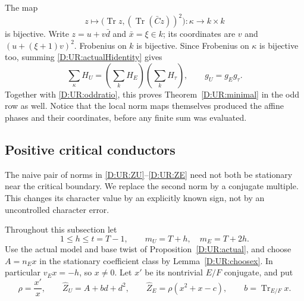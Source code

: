 \documentclass[11pt]{amsart}
\theoremstyle{definition}
\theoremstyle{remark}
\newcommand{\Tr}{\operatorname{Tr}}
\begin{document}
The map
\[
 z\longmapsto\bigl(\Tr z,(\Tr(\bar C z))^2\bigr)
        :\kappa\longrightarrow k\times k
\]
is bijective. Write $z=u+v\bar d$ and $\bar x=\xi\in k$; its coordinates
are $v$ and $(u+(\xi+1)v)^2$. Frobenius on $k$ is bijective.
Since Frobenius on $\kappa$ is bijective too, summing
\eqref{D:UR:actualHidentity} gives
\[
 \sum_{\kappa}H_U
     =\left(\sum_kH_E\right)\left(\sum_kH_\tau\right),
 \qquad g_U=g_Eg_\tau.
\]
Together with \eqref{D:UR:oddratio}, this proves Theorem~\ref{D:UR:minimal} in the
odd row as well. Notice that the local norm maps themselves produced the
affine phases and their coordinates, before any finite sum was evaluated.

\subsection{Positive critical conductors}
\label{D:UR:sec:critical}
The naive pair of norms in \eqref{D:UR:ZU}--\eqref{D:UR:ZE} need not both be
stationary near the critical boundary. We replace the second norm by a
conjugate multiple. This changes its character value by an explicitly
known sign, not by an uncontrolled character error.

Throughout this subsection let
\[
 1\le h\le t=T-1,\qquad m_U=T+h,\quad m_E=T+2h.
\]
Use the actual model and base twist of Proposition~\ref{D:UR:actual}, and choose
$A=n_E x$ in the stationary coefficient class by Lemma~\ref{D:UR:choosex}.
In particular $v_E x=-h$, so $x\ne0$. Let $x'$ be its nontrivial
$E/F$ conjugate, and put
\begin{equation}\label{D:UR:newrep}
 \rho=\frac{x'}x,\qquad
 \widehat Z_U=A+bd+d^2,\qquad
 \widehat Z_E=\rho(x^2+x-c),\qquad b=\Tr_{E/F}x.
\end{equation}
\end{document}
